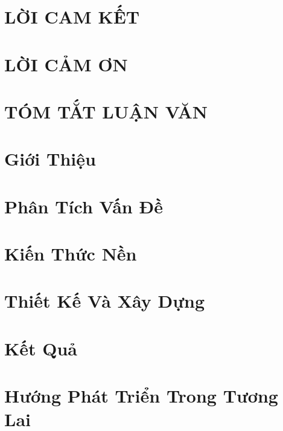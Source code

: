 \documentclass[14pt]{hcmutarticle}
\newcommand\blankpage{%
    \null
    \thispagestyle{empty}%
    \addtocounter{page}{-1}%
    \newpage}
\begin{document}

\fancyhead[L]{}
\fancyhead[R]{}




\afterpage{\blankpage}

\setcounter{secnumdepth}{-2}

\newpage
\chapter{LỜI CAM KẾT}


\newpage
\chapter{LỜI CẢM ƠN}


\newpage
\chapter{TÓM TẮT LUẬN VĂN}



\newpage
\tableofcontents
\setcounter{secnumdepth}{5}

\newpage
\listoffigures %

\newpage
\listoftables %

\newpage
\printglossary[title=Danh mục các từ viết tắt,toctitle=Danh mục các từ viết tắt]

\newpage


\fancyhead[L]{}
\fancyhead[R]{\leftmark}


\newpage
\chapter{Giới Thiệu}


\chapter{Phân Tích Vấn Đề}


\chapter{Kiến Thức Nền}


\chapter{Thiết Kế Và Xây Dựng}


\chapter{Kết Quả}


\chapter{Hướng Phát Triển Trong Tương Lai}


\newpage
\thispagestyle{empty}


\end{document}
